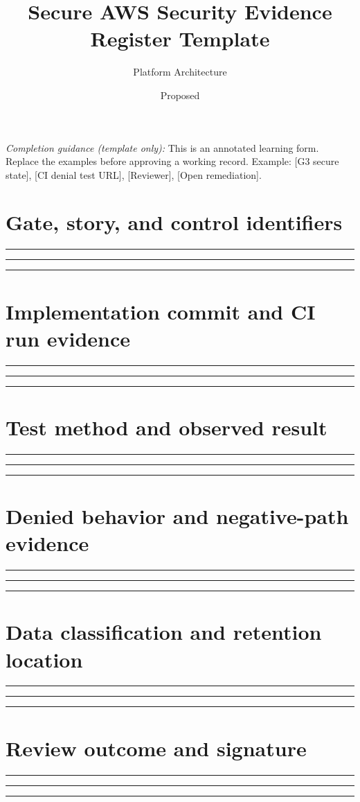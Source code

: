 \documentclass[11pt,letterpaper]{article}
\title{Secure AWS Security Evidence Register Template}
\author{Platform Architecture}
\date{Proposed}
\newcommand{\WritingLines}{\par\vspace{5mm}\noindent\rule{\linewidth}{0.3pt}\par\vspace{5mm}\noindent\rule{\linewidth}{0.3pt}\par\vspace{5mm}\noindent\rule{\linewidth}{0.3pt}\par}
\begin{document}
\maketitle
\noindent\emph{Completion guidance (template only):} 
This is an annotated learning form. Replace the examples before approving a working record. Example: [G3 secure state], [CI denial test URL], [Reviewer], [Open remediation].
\section{Gate, story, and control identifiers}
\WritingLines
\section{Implementation commit and CI run evidence}
\WritingLines
\section{Test method and observed result}
\WritingLines
\section{Denied behavior and negative-path evidence}
\WritingLines
\section{Data classification and retention location}
\WritingLines
\section{Review outcome and signature}
\WritingLines
\end{document}
